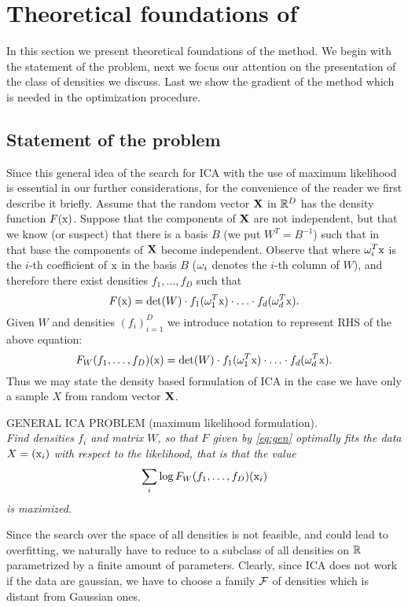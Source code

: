 \section{Theoretical foundations of \ICA{}}
\label{p}

In this section we present theoretical foundations of the method.
We begin with the statement of the problem, next we focus our attention on the presentation of the class of densities we discuss. Last we show the gradient of the method which is needed in the optimization procedure.


\subsection{Statement of the problem}

Since this general idea of the search for ICA with the use of
maximum likelihood is essential in our further considerations, for the convenience of the reader we first describe it briefly.
Assume that the random vector $\mathbf{X}$ in $\mathbb{R}^D$ has the density function $F(\mathrm{x})$.
Suppose that the components of $\mathbf{X}$ are not independent, but that
we know (or suspect) that there is a basis $B$ (we put $W^T=B^{-1}$) such that in that base the
components of $\mathbf{X}$ become independent. Observe that where $\omega_i^T\mathrm{x}$ is the $i$-th coefficient of $\mathrm{x}$ in the basis $B$ ($\omega_i$ denotes the $i$-th column of $W$), and therefore there exist densities 
$f_1,\ldots,f_D$ such that
\begin{equation} \label{eq:gen}
F(\mathrm{x})=\det(W) \cdot f_1(\omega_1^T\mathrm{x}) \cdot \ldots \cdot f_d(\omega_d^T\mathrm{x}).
\end{equation}
Given $W$ and densities $(f_i)_{i=1}^D$ we introduce notation to represent
RHS of the above equation:
$$
F_W(f_1,\ldots,f_D)(\mathrm{x})=\det(W) \cdot f_1(\omega_1^T\mathrm{x}) \cdot \ldots \cdot f_d(\omega_d^T\mathrm{x}).
$$
Thus we may state the density based formulation of ICA in the case we have only a sample
$X$ from random vector $\mathbf{X}$.

\medskip

\noindent GENERAL ICA PROBLEM (maximum likelihood formulation). \\{\em Find densities $f_i$ and matrix $W$, so that $F$ given by
\eqref{eq:gen} optimally fits the data $X=(\mathrm{x}_i)$ with respect to the likelihood, that is that the value
$$
\sum_i \log F_W(f_1,\ldots,f_D)(\mathrm{x}_i)
$$
is maximized.
}

\medskip

Since the search over the space of all densities is not feasible, and could lead to overfitting, we naturally have to reduce to a subclass of all densities on $\mathbb{R}$ parametrized by a finite amount of parameters. Clearly, since 
ICA does not work if the data are gaussian, we have to choose a family $\mathcal{F}$ of densities which is distant from Gaussian ones. 

